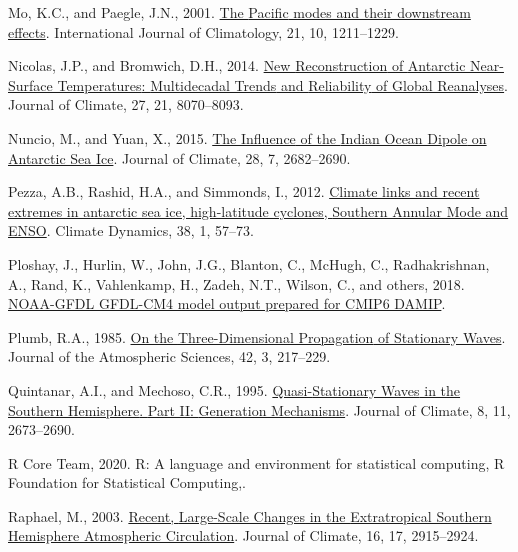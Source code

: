 \documentclass[12pt,oneside]{reedthesis}
\newlength{\cslhangindent}
\newenvironment{CSLReferences}[2] %
 {%
  \setlength{\parindent}{0pt}
  \ifodd #1 \everypar{\setlength{\hangindent}{\cslhangindent}}\ignorespaces\fi
  \ifnum #2 > 0
  \setlength{\parskip}{#2\baselineskip}
  \fi
 }%
 {}
\begin{document}
\begin{CSLReferences}{1}{0}
\leavevmode{}%
Mo, K.C., and Paegle, J.N., 2001. \href{https://doi.org/10.1002/joc.685}{The {Pacific} modes and their downstream effects}. International Journal of Climatology, 21, 10, 1211--1229.

\leavevmode{}%
Nicolas, J.P., and Bromwich, D.H., 2014. \href{https://doi.org/10.1175/JCLI-D-13-00733.1}{New {Reconstruction} of {Antarctic Near-Surface Temperatures}: {Multidecadal Trends} and {Reliability} of {Global Reanalyses}}. Journal of Climate, 27, 21, 8070--8093.

\leavevmode{}%
Nuncio, M., and Yuan, X., 2015. \href{https://doi.org/10.1175/JCLI-D-14-00390.1}{The {Influence} of the {Indian Ocean Dipole} on {Antarctic Sea Ice}}. Journal of Climate, 28, 7, 2682--2690.

\leavevmode{}%
Pezza, A.B., Rashid, H.A., and Simmonds, I., 2012. \href{https://doi.org/10.1007/s00382-011-1044-y}{Climate links and recent extremes in antarctic sea ice, high-latitude cyclones, {Southern Annular Mode} and {ENSO}}. Climate Dynamics, 38, 1, 57--73.

\leavevmode{}%
Ploshay, J., Hurlin, W., John, J.G., Blanton, C., McHugh, C., Radhakrishnan, A., Rand, K., Vahlenkamp, H., Zadeh, N.T., Wilson, C., and others, 2018. \href{https://doi.org/10.22033/ESGF/CMIP6.11383}{NOAA-GFDL GFDL-CM4 model output prepared for CMIP6 DAMIP}.

\leavevmode{}%
Plumb, R.A., 1985. \href{https://doi.org/10.1175/1520-0469(1985)042\%3C0217:OTTDPO\%3E2.0.CO;2}{On the {Three-Dimensional Propagation} of {Stationary Waves}}. Journal of the Atmospheric Sciences, 42, 3, 217--229.

\leavevmode{}%
Quintanar, A.I., and Mechoso, C.R., 1995. \href{https://doi.org/10.1175/1520-0442(1995)008\%3C2673:QSWITS\%3E2.0.CO;2}{Quasi-{Stationary Waves} in the {Southern Hemisphere}. {Part II}: {Generation Mechanisms}}. Journal of Climate, 8, 11, 2673--2690.

\leavevmode{}%
R Core Team, 2020. R: {A} language and environment for statistical computing, {R Foundation for Statistical Computing},.

\leavevmode{}%
Raphael, M., 2003. \href{https://doi.org/10.1175/1520-0442(2003)016\%3C2915:RLCITE\%3E2.0.CO;2}{Recent, {Large-Scale Changes} in the {Extratropical Southern Hemisphere Atmospheric Circulation}}. Journal of Climate, 16, 17, 2915--2924.


\end{CSLReferences}
\end{document}
